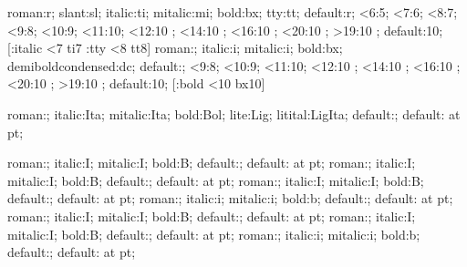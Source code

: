 %
    {roman:r; slant:sl; italic:ti; mitalic:mi; bold:bx; tty:tt;
     default:r;}%
    {<6:5; <7:6; <8:7; <9:8; <10:9; <11:10; <12:10 \sc@led\magstephalf;
     <14:10 \sc@led{}; <16:10 \sc@led{};
     <20:10 \sc@led{}; >19:10 \sc@led{};
     default:10;}%
    [\ifStyle:italic \ifnum\Fsize<7 ti7\fi\fi
     \ifStyle:tty \ifnum\Fsize<8 tt8\fi\fi]
%
    {roman:; italic:i; mitalic:i; bold:bx; demiboldcondensed:dc;
     default:;}%
    {<9:8; <10:9; <11:10; <12:10 \sc@led\magstephalf;
     <14:10 \sc@led{}; <16:10 \sc@led{};
     <20:10 \sc@led{}; >19:10 \sc@led{};
     default:10;}%
    [\ifStyle:bold \ifnum\Fsize<10 bx10\fi\fi]

 {roman:; italic:Ita; mitalic:Ita; bold:Bol; 
  lite:Lig; litital:LigIta; default:;}
 {default: at \Fsize pt;}

    {roman:; italic:I; mitalic:I; bold:B; default:;}
    {default: at \Fsize pt;}
    {roman:; italic:I; mitalic:I; bold:B; default:;}
    {default: at \Fsize pt;}
    {roman:; italic:I; mitalic:I; bold:B; default:;}
    {default: at \Fsize pt;}
    {roman:; italic:i; mitalic:i; bold:b; default:;}
    {default: at \Fsize pt;}
    {roman:; italic:I; mitalic:I; bold:B; default:;}
    {default: at \Fsize pt;}
    {roman:; italic:I; mitalic:I; bold:B; default:;}
    {default: at \Fsize pt;}
    {roman:; italic:i; mitalic:i; bold:b; default:;}
    {default: at \Fsize pt;}

\endinput

